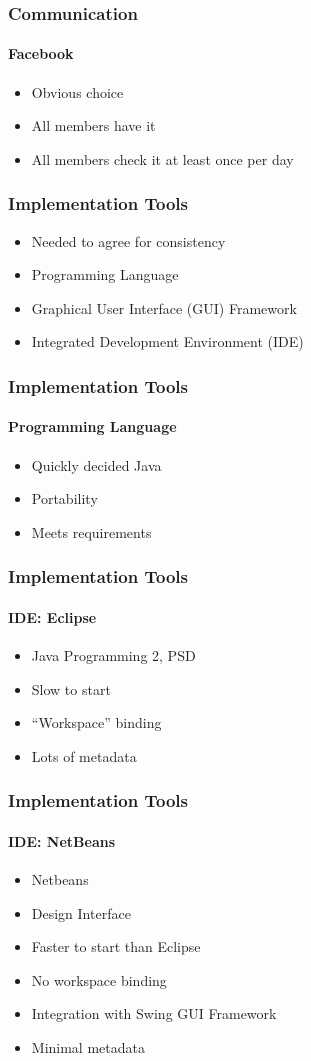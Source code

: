 \begin{frame}
  \frametitle{Communication}
  \framesubtitle{Facebook}
\begin{itemize}
  \item{Obvious choice}
  \item{All members have it}
  \item{All members check it at least once per day}
\end{itemize}
\end{frame}

\begin{frame}
  \frametitle{Implementation Tools}
  \begin{itemize}
    \item{Needed to agree for consistency}
    \item{Programming Language}
    \item{Graphical User Interface (GUI) Framework}
    \item{Integrated Development Environment (IDE)}
  \end{itemize}
\end{frame}

\begin{frame}
  \frametitle{Implementation Tools}
  \framesubtitle{Programming Language}
  \begin{itemize}
    \item{Quickly decided Java}
    \item{Portability}
    \item{Meets requirements}
  \end{itemize}
\end{frame}

\begin{frame}
  \frametitle{Implementation Tools}
  \framesubtitle{IDE: Eclipse}
  \begin{itemize}
  \item{Java Programming 2, PSD}
  \item{Slow to start}
  \item{``Workspace'' binding}
  \item{Lots of metadata}
  \end{itemize}
\end{frame}

\begin{frame}
  \frametitle{Implementation Tools}
  \framesubtitle{IDE: NetBeans}
  \begin{itemize}
  \item{Netbeans}
  \item{Design Interface}
  \item{Faster to start than Eclipse}
  \item{No workspace binding}
  \item{Integration with Swing GUI Framework}
  \item{Minimal metadata}
  \end{itemize}
\end{frame}

